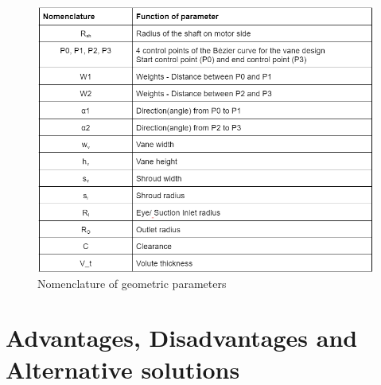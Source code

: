 \documentclass[11pt,a4paper]{scrartcl}
\begin{document}
\begin{figure}[h]
    \centering
    \includegraphics[scale=1]{image11.png}
    \caption{ Nomenclature of geometric parameters
 }
    \label{fig:image4}
    
\end{figure}
\newpage
\section{Advantages, Disadvantages and Alternative solutions}
\end{document}
